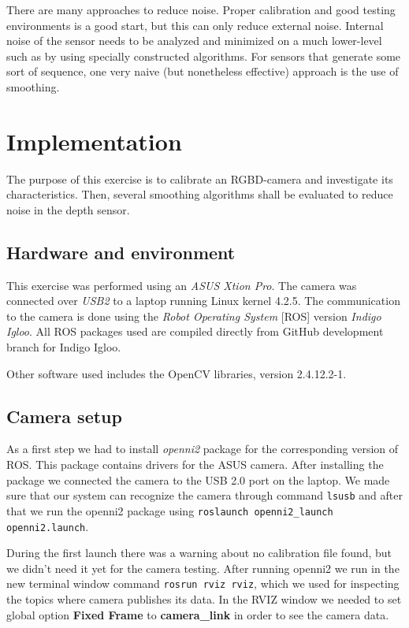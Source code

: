 \documentclass[11pt]{article}
\begin{document}
There are many approaches to reduce noise. Proper calibration and good testing
environments is a good start, but this can only reduce external noise. Internal
noise of the sensor needs to be analyzed and minimized on a much lower-level
such as by using specially constructed algorithms. For sensors that generate
some sort of sequence, one very naive (but nonetheless effective) approach is
the use of smoothing. \par

\section{Implementation}
The purpose of this exercise is to calibrate an RGBD-camera and investigate its
characteristics. Then, several smoothing algorithms shall be evaluated to reduce
noise in the depth sensor.

\subsection{Hardware and environment}
This exercise was performed using an \emph{ASUS Xtion Pro}. The camera was
connected over \emph{USB2} to a laptop running Linux kernel 4.2.5. The
communication to the camera is done using the \emph{Robot Operating System}
[ROS] version \emph{Indigo Igloo}. All ROS packages used are compiled directly
from GitHub development branch for Indigo Igloo. \par
Other software used includes the OpenCV libraries, version 2.4.12.2-1.

\subsection{Camera setup}
As a first step we had to install \emph{openni2} package for the corresponding
version of ROS. This package contains drivers for the ASUS camera. After
installing the package we connected the camera to the USB 2.0 port on the
laptop. We made sure that our system can recognize the camera through command
\texttt{lsusb} and after that we run the openni2 package using \texttt{roslaunch
  openni2\_launch openni2.launch}. \par
During the first launch there was a warning about no calibration file found, but
we didn't need it yet for the camera testing. After running openni2 we run in
the new terminal window command \texttt{rosrun rviz rviz}, which we used for
inspecting the topics where camera publishes its data. In the RVIZ window we
needed to set global option \textbf{Fixed Frame} to \textbf{camera\_link} in
order to see the camera data. \par
\end{document}
